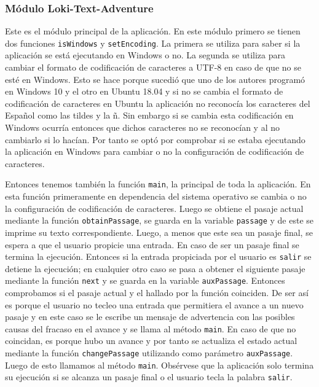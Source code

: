\documentclass[12pt]{article}
\begin{document}
\subsubsection{Módulo Loki-Text-Adventure}

Este es el m\'odulo principal de la aplicaci\'on. En este m\'odulo primero se tienen dos funciones \verb|isWindows| y \verb|setEncoding|. La primera se utiliza para saber si la aplicaci\'on se est\'a ejecutando en Windows o no. La segunda se utiliza para cambiar el formato de codificaci\'on de caracteres a UTF-8 en caso de que no se esté en Windows. Esto se hace porque sucedió que uno de los autores program\'o en Windows 10 y el otro en Ubuntu 18.04 y si no se cambia el formato de codificaci\'on de caracteres en Ubuntu la aplicaci\'on no reconoc\'ia los caracteres del Español como las tildes y la ñ. Sin embargo si se cambia esta codificaci\'on en Windows ocurr\'ia entonces que dichos caracteres no se reconoc\'ian y al no cambiarlo si lo hac\'ian. Por tanto se opt\'o por comprobar si se estaba ejecutando la aplicaci\'on en Windows para cambiar o no la configuraci\'on de codificaci\'on de caracteres.

Entonces tenemos tambi\'en la funci\'on \verb|main|, la principal de toda la aplicaci\'on. En esta funci\'on primeramente en dependencia del sistema operativo se cambia o no la configuraci\'on de codificaci\'on de caracteres. Luego se obtiene el pasaje actual mediante la funci\'on \verb|obtainPassage|, se guarda en la variable \verb|passage| y de este se imprime su texto correspondiente. Luego, a menos que este sea un pasaje final, se espera a que el usuario propicie una entrada. En caso de ser un pasaje final se termina la ejecuci\'on. Entonces si la entrada propiciada por el usuario es \verb|salir| se detiene la ejecuci\'on; en cualquier otro caso se pasa a obtener el siguiente pasaje mediante la funci\'on \verb|next| y se guarda en la variable \verb|auxPassage|. Entonces comprobamos si el pasaje actual y el hallado por la funci\'on coinciden. De ser as\'i es porque el usuario no tecleo una entrada que permitiera el avance a un nuevo pasaje y en este caso se le escribe un mensaje de advertencia con las posibles causas del fracaso en el avance y se llama al m\'etodo \verb|main|. En caso de que no coincidan, es porque hubo un avance y por tanto se actualiza el estado actual mediante la funci\'on \verb|changePassage| utilizando como par\'ametro \verb|auxPassage|. Luego de esto llamamos al m\'etodo \verb|main|. Obs\'ervese que la aplicaci\'on solo termina su ejecuci\'on si se alcanza un pasaje final o el usuario tecla la palabra \verb|salir|.
\end{document}

